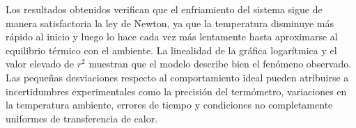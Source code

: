 Los resultados obtenidos verifican que el enfriamiento del sistema sigue de manera satisfactoria la ley de Newton, ya que la temperatura disminuye más rápido al inicio y luego lo hace cada vez más lentamente hasta aproximarse al equilibrio térmico con el ambiente. La linealidad de la gráfica logarítmica y el valor elevado de \(r^2\) muestran que el modelo describe bien el fenómeno observado. Las pequeñas desviaciones respecto al comportamiento ideal pueden atribuirse a incertidumbres experimentales como la precisión del termómetro, variaciones en la temperatura ambiente, errores de tiempo y condiciones no completamente uniformes de transferencia de calor.
